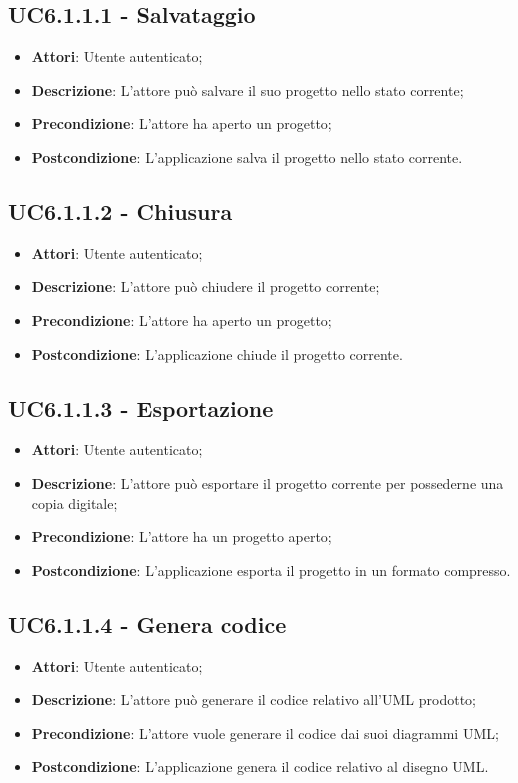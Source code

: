 \subsection{UC6.1.1.1 - Salvataggio} 
\label{ssec:UC6.1.1.1} 
\begin{itemize} 
\item \textbf{Attori}: Utente autenticato;
\item \textbf{Descrizione}: L’attore può salvare il suo progetto nello stato corrente;
\item \textbf{Precondizione}: L’attore ha aperto un progetto;
\item \textbf{Postcondizione}: L’applicazione salva il progetto nello stato corrente.
\end{itemize} 
\subsection{UC6.1.1.2 - Chiusura} 
\label{ssec:UC6.1.1.2} 
\begin{itemize} 
\item \textbf{Attori}: Utente autenticato;
\item \textbf{Descrizione}: L’attore può chiudere il progetto corrente;
\item \textbf{Precondizione}: L'attore ha aperto un progetto;
\item \textbf{Postcondizione}: L’applicazione chiude il progetto corrente.
\end{itemize} 
\subsection{UC6.1.1.3 - Esportazione} 
\label{ssec:UC6.1.1.3} 
\begin{itemize} 
\item \textbf{Attori}: Utente autenticato;
\item \textbf{Descrizione}: L’attore può esportare il progetto corrente per possederne una copia digitale;
\item \textbf{Precondizione}: L’attore ha un progetto aperto;
\item \textbf{Postcondizione}: L’applicazione esporta il progetto in un formato compresso.
\end{itemize} 
\subsection{UC6.1.1.4 - Genera codice} 
\label{ssec:UC6.1.1.4} 
\begin{itemize} 
\item \textbf{Attori}: Utente autenticato;
\item \textbf{Descrizione}: L’attore può generare il codice relativo all’UML prodotto;
\item \textbf{Precondizione}: L’attore vuole generare il codice dai suoi diagrammi UML;
\item \textbf{Postcondizione}: L’applicazione genera il codice relativo al disegno UML.
\end{itemize} 
